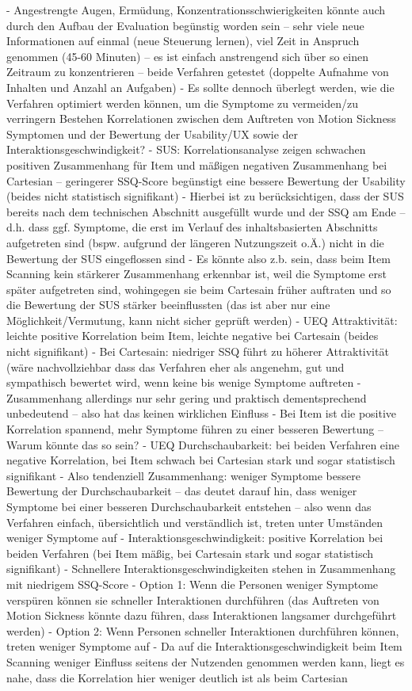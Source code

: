 -	Angestrengte Augen, Ermüdung, Konzentrationsschwierigkeiten könnte auch durch den Aufbau der Evaluation begünstig worden sein – sehr viele neue Informationen auf einmal (neue Steuerung lernen), viel Zeit in Anspruch genommen (45-60 Minuten) – es ist einfach anstrengend sich über so einen Zeitraum zu konzentrieren – beide Verfahren getestet (doppelte Aufnahme von Inhalten und Anzahl an Aufgaben)
-	Es sollte dennoch überlegt werden, wie die Verfahren optimiert werden können, um die Symptome zu vermeiden/zu verringern 
Bestehen Korrelationen zwischen dem Auftreten von Motion Sickness Symptomen und der Bewertung der Usability/UX sowie der Interaktionsgeschwindigkeit? 
-	SUS: Korrelationsanalyse zeigen schwachen positiven Zusammenhang für Item und mäßigen negativen Zusammenhang bei Cartesian – geringerer SSQ-Score begünstigt eine bessere Bewertung der Usability (beides nicht statistisch signifikant) 
-	Hierbei ist zu berücksichtigen, dass der SUS bereits nach dem technischen Abschnitt ausgefüllt wurde und der SSQ am Ende – d.h. dass ggf. Symptome, die erst im Verlauf des inhaltsbasierten Abschnitts aufgetreten sind (bspw. aufgrund der längeren Nutzungszeit o.Ä.) nicht in die Bewertung der SUS eingeflossen sind 
-	Es könnte also z.b. sein, dass beim Item Scanning kein stärkerer Zusammenhang erkennbar ist, weil die Symptome erst später aufgetreten sind, wohingegen sie beim Cartesain früher auftraten und so die Bewertung der SUS stärker beeinflussten (das ist aber nur eine Möglichkeit/Vermutung, kann nicht sicher geprüft werden)
-	UEQ Attraktivität: leichte positive Korrelation beim Item, leichte negative bei Cartesain (beides nicht signifikant)
-	Bei Cartesain: niedriger SSQ führt zu höherer Attraktivität (wäre nachvollziehbar dass das Verfahren eher als angenehm, gut und sympathisch bewertet wird, wenn keine bis wenige Symptome auftreten
-	Zusammenhang allerdings nur sehr gering und praktisch dementsprechend unbedeutend – also hat das keinen wirklichen Einfluss 
-	Bei Item ist die positive Korrelation spannend, mehr Symptome führen zu einer besseren Bewertung – Warum könnte das so sein?
-	UEQ Durchschaubarkeit: bei beiden Verfahren eine negative Korrelation, bei Item schwach bei Cartesian stark und sogar statistisch signifikant 
-	Also tendenziell Zusammenhang: weniger Symptome bessere Bewertung der Durchschaubarkeit – das deutet darauf hin, dass weniger Symptome bei einer besseren Durchschaubarkeit entstehen – also wenn das Verfahren einfach, übersichtlich und verständlich ist, treten unter Umständen weniger Symptome auf 
-	Interaktionsgeschwindigkeit: positive Korrelation bei beiden Verfahren (bei Item mäßig, bei Cartesain stark und sogar statistisch signifikant) 
-	Schnellere Interaktionsgeschwindigkeiten stehen in Zusammenhang mit niedrigem SSQ-Score 
-	Option 1: Wenn die Personen weniger Symptome verspüren können sie schneller Interaktionen durchführen (das Auftreten von Motion Sickness könnte dazu führen, dass Interaktionen langsamer durchgeführt werden) 
-	Option 2: Wenn Personen schneller Interaktionen durchführen können, treten weniger Symptome auf 
-	Da auf die Interaktionsgeschwindigkeit beim Item Scanning weniger Einfluss seitens der Nutzenden genommen werden kann, liegt es nahe, dass die Korrelation hier weniger deutlich ist als beim Cartesian 


